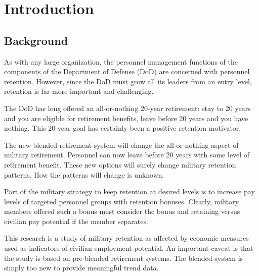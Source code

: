 \documentclass[12pt,letterpaper,toc=flat,oneside]{report}
\theoremstyle{definition}
\theoremstyle{definition}
\theoremstyle{definition}
\theoremstyle{remark}
\begin{document}
\renewcommand\listfigurename{\centering \Large List of Figures}
\listoffigures
\newpage
\setcounter{chapter}{0}
\doublespacing
\setcounter{page}{1}
	\renewcommand{\thepage}{\arabic{page}}
\hypertarget{introduction}{%
\chapter{Introduction}\label{introduction}}

\hypertarget{background}{%
\section{Background}\label{background}}

As with any large organization, the personnel management functions of
the components of the Department of Defense (DoD) are concerned with
personnel retention. However, since the DoD must grow all its leaders
from an entry level, retention is far more important and challenging.

The DoD has long offered an all-or-nothing 20-year retirement: stay to
20 years and you are eligible for retirement benefits, leave before 20
years and you have nothing. This 20-year goal has certainly been a
positive retention motivator.

The new blended retirement system will change the all-or-nothing aspect
of military retirement. Personnel can now leave before 20 years with
some level of retirement benefit. These new options will surely change
military retention patterns. How the patterns will change is unknown.

Part of the military strategy to keep retention at desired levels is to
increase pay levels of targeted personnel groups with retention bonuses.
Clearly, military members offered such a bonus must consider the bonus
and retaining versus civilian pay potential if the member separates.

This research is a study of military retention as affected by economic
measures used as indicators of civilian employment potential. An
important caveat is that the study is based on pre-blended retirement
systems. The blended system is simply too new to provide meaningful
trend data.
\end{document}
